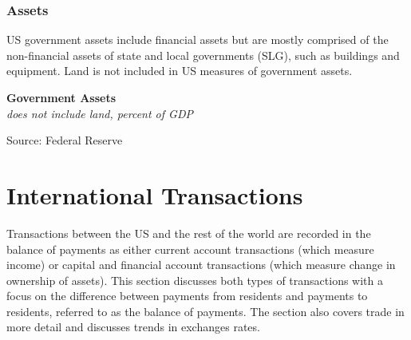 \documentclass{report}
\makeatletter
\newcommand{\tbllink}[1]{\href{https://raw.githubusercontent.com/bdecon/US-chartbook/master/chartbook/data/#1}{\faTable}}
\newcommand*\short[1]{\expandafter\@gobbletwo\number\numexpr#1\relax}
\newcommand{\sbar}[4]{
		\addplot[ybar stacked, bar width=2.3pt, draw opacity=0, fill=#1] 
			table [x=#2, y=#3, col sep=comma]{#4};}
\newcommand{\dateaxisticks}{
		date coordinates in=x, axis line style={draw=none},
		xmax={2023-10-01},
		max space between ticks=40,	    
		xtick={{1990-01-01}, {1992-01-01}, {1994-01-01}, 
			{1996-01-01}, {1998-01-01}, {2000-01-01}, 
			{2002-01-01}, {2004-01-01}, {2006-01-01},
			{2008-01-01}, {2010-01-01}, {2012-01-01}, {2014-01-01},
		    {2016-01-01}, {2018-01-01}, {2020-01-01}, {2022-01-01}, 
		    {2024-01-01}, {2026-01-01}},
		minor xtick={{1989-01-01}, {1991-01-01}, {1993-01-01},
			{1995-01-01}, {1997-01-01}, {1999-01-01}, 
			{2001-01-01}, {2003-01-01}, {2005-01-01}, {2007-01-01},
		    {2009-01-01}, {2011-01-01}, {2013-01-01}, {2015-01-01},
		    {2017-01-01}, {2019-01-01}, {2021-01-01}, {2023-01-01}, 
		    {2025-01-01}, {2027-01-01}},
		enlarge y limits={0.06}, enlarge x limits={0.01},
		}
\newcommand{\bbar}[2]{extra #1 ticks = {{#2}}, extra #1 tick labels = ,
		extra #1 tick style = {grid=major, grid style={thick, black!25}},}
\newcommand{\rbars}{
		\fill[color=black!10] (axis cs:{1990-07-01},\pgfkeysvalueof{/pgfplots/ymin}) rectangle 
			(axis cs:{1991-03-01}, \pgfkeysvalueof{/pgfplots/ymax});
		\fill[color=black!10] (axis cs:{2007-12-01},\pgfkeysvalueof{/pgfplots/ymin}) rectangle 
			(axis cs:{2009-07-01}, \pgfkeysvalueof{/pgfplots/ymax});
		\fill[color=black!10] (axis cs:{2001-03-01},\pgfkeysvalueof{/pgfplots/ymin}) rectangle 
			(axis cs:{2001-11-01}, \pgfkeysvalueof{/pgfplots/ymax});
		\fill[color=black!10] (axis cs:{2020-02-01},\pgfkeysvalueof{/pgfplots/ymin}) rectangle 
			(axis cs:{2020-05-01}, \pgfkeysvalueof{/pgfplots/ymax});}
\makeatother
\begin{document}
{\begin{minipage}{0.76\textwidth}
\subsubsection*{Assets}  
\small US government assets include financial assets but are mostly comprised of the non-financial assets of state and local governments (SLG), such as buildings and equipment. Land is not included in US measures of government assets. 


\vspace{2mm}

\normalsize \textbf{Government Assets}\\
\footnotesize{\textit{does not include land, percent of GDP}}
\vspace{3.95cm}

\hspace{4mm} 

\footnotesize{Source: Federal Reserve} \hfill \tbllink{govassets.csv}
\end{minipage}
\newpage
\hypertarget{ext}{\label{ext}}
\section*{International Transactions}
\begin{minipage}{0.76\textwidth}
\small Transactions between the US and the rest of the world are recorded in the balance of payments as either current account transactions (which measure income) or capital and financial account transactions (which measure change in ownership of assets). This section discusses both types of transactions with a focus on the difference between payments from residents and payments to residents, referred to as the balance of payments. The section also covers trade in more detail and discusses trends in exchanges rates. 


\end{minipage}}
\end{document}

